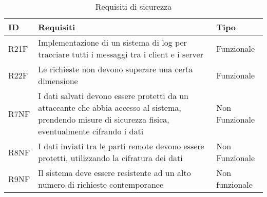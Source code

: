 \begin{table}[htbp]
    \centering
    \begin{tabular} {|P{1.3cm}|P{11.2cm}|P{3cm}|}
        \hline
        \textbf{ID}             & \textbf{Requisiti}                                                                           & \textbf{Tipo}  \\
        \hline
        R21F                    & Implementazione di un sistema di log per tracciare tutti i messaggi
        tra i client e i server & Funzionale                                                                                                    \\
        \hline
        R22F                    & Le richieste non devono superare una certa dimensione                                        & Funzionale     \\
        \hline
        R7NF                    & I dati salvati devono essere protetti da un attaccante che abbia
        accesso al sistema, prendendo misure di sicurezza fisica, eventualmente
        cifrando i dati         & Non Funzionale                                                                                                \\
        \hline
        R8NF                    & I dati inviati tra le parti remote devono essere protetti, utilizzando la cifratura dei dati & Non Funzionale \\
        \hline
        R9NF                    & Il sistema deve essere resistente ad un alto numero di richieste contemporanee               & Non funzionale \\
        \hline
    \end{tabular}
    \caption{Requisiti di sicurezza}
\end{table}

\clearpage